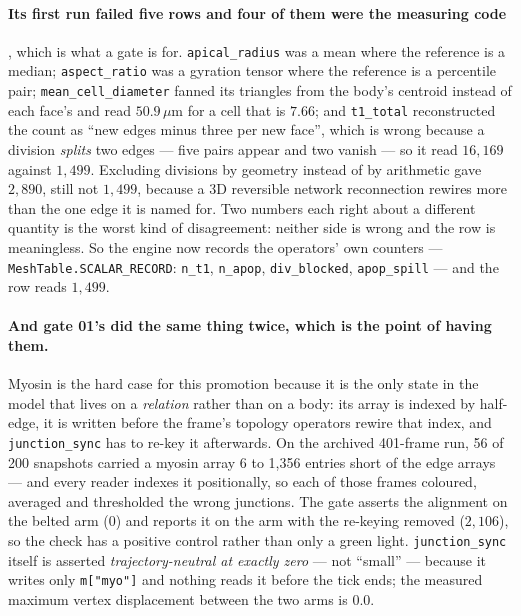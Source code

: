 \documentclass[11pt,a4paper]{article}
\newcommand{\code}[1]{\texttt{\small #1}}
\begin{document}
\paragraph{Its first run failed five rows and four of them were the measuring code}, which is what a
gate is for. \code{apical\_radius} was a mean where the reference is a median; \code{aspect\_ratio}
was a gyration tensor where the reference is a percentile pair; \code{mean\_cell\_diameter} fanned
its triangles from the body's centroid instead of each face's and read $50.9\,\mu$m for a cell that
is $7.66$; and \code{t1\_total} reconstructed the count as ``new edges minus three per new face'',
which is wrong because a division \emph{splits} two edges --- five pairs appear and two vanish --- so
it read $16{,}169$ against $1{,}499$. Excluding divisions by geometry instead of by arithmetic gave
$2{,}890$, still not $1{,}499$, because a 3D reversible network reconnection rewires more than the
one edge it is named for. Two numbers each right about a different quantity is the worst kind of
disagreement: neither side is wrong and the row is meaningless. So the engine now records the
operators' own counters --- \code{MeshTable.SCALAR\_RECORD}: \code{n\_t1}, \code{n\_apop},
\code{div\_blocked}, \code{apop\_spill} --- and the row reads $1{,}499$.

\paragraph{And gate 01's did the same thing twice, which is the point of having them.}
Myosin is the hard case for this promotion because it is the only state in the model that lives on a
\emph{relation} rather than on a body: its array is indexed by half-edge, it is written before the
frame's topology operators rewire that index, and \code{junction\_sync} has to re-key it afterwards.
On the archived 401-frame run, 56 of 200 snapshots carried a myosin array 6 to 1{,}356 entries short
of the edge arrays --- and every reader indexes it positionally, so each of those frames coloured,
averaged and thresholded the wrong junctions. The gate asserts the alignment on the belted arm
($0$) and reports it on the arm with the re-keying removed ($2{,}106$), so the check has a positive
control rather than only a green light. \code{junction\_sync} itself is asserted
\emph{trajectory-neutral at exactly zero} --- not ``small'' --- because it writes only
\code{m["myo"]} and nothing reads it before the tick ends; the measured maximum vertex displacement
between the two arms is $0.0$.
\end{document}
